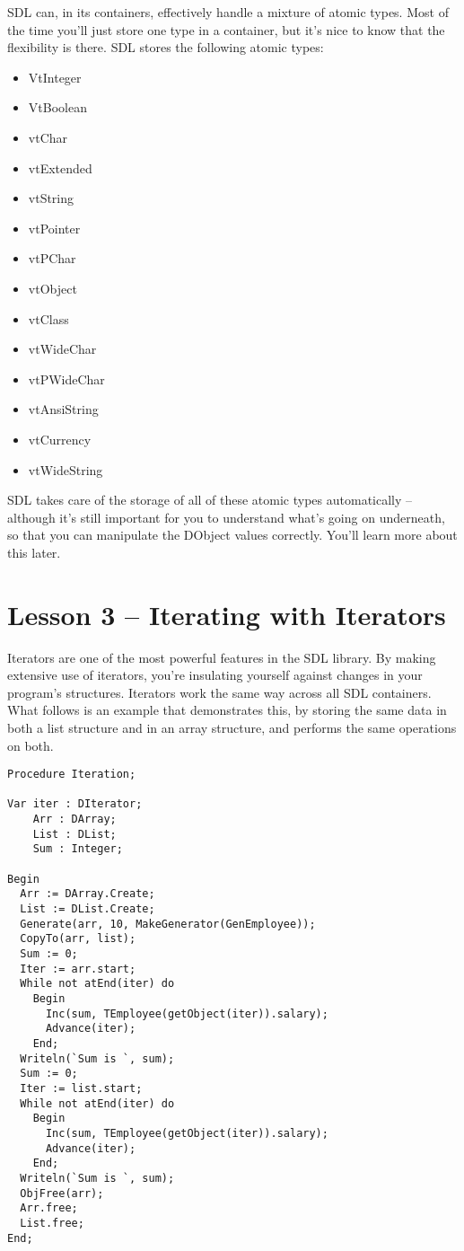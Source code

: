\documentclass{report}
\begin{document}
SDL can, in its containers, effectively handle a mixture of atomic types.
Most of the time you'll just store one type in a container, but it's nice to
know that the flexibility is there. SDL stores the following atomic types: 

\begin{itemize}
\item VtInteger
\item VtBoolean
\item vtChar
\item vtExtended
\item vtString
\item vtPointer
\item vtPChar
\item vtObject
\item vtClass
\item vtWideChar
\item vtPWideChar
\item vtAnsiString
\item vtCurrency
\item vtWideString
\end{itemize}

SDL takes care of the storage of all of these atomic types automatically --
although it's still important for you to understand what's going on
underneath, so that you can manipulate the DObject values correctly. You'll
learn more about this later.

\section{Lesson 3 -- Iterating with Iterators}

Iterators are one of the most powerful features in the SDL library. By
making extensive use of iterators, you're insulating yourself against
changes in your program's structures. Iterators work the same way across all
SDL containers. What follows is an example that demonstrates this, by
storing the same data in both a list structure and in an array structure,
and performs the same operations on both.

\begin{lstlisting}
Procedure Iteration;

Var iter : DIterator;
    Arr : DArray;
    List : DList;
    Sum : Integer;

Begin
  Arr := DArray.Create;
  List := DList.Create;
  Generate(arr, 10, MakeGenerator(GenEmployee));
  CopyTo(arr, list);
  Sum := 0;
  Iter := arr.start;
  While not atEnd(iter) do
    Begin
      Inc(sum, TEmployee(getObject(iter)).salary);
      Advance(iter);
    End;
  Writeln(`Sum is `, sum);
  Sum := 0;
  Iter := list.start;
  While not atEnd(iter) do
    Begin
      Inc(sum, TEmployee(getObject(iter)).salary);
      Advance(iter);
    End;
  Writeln(`Sum is `, sum);
  ObjFree(arr);
  Arr.free;
  List.free;
End;
\end{lstlisting}
\end{document}
